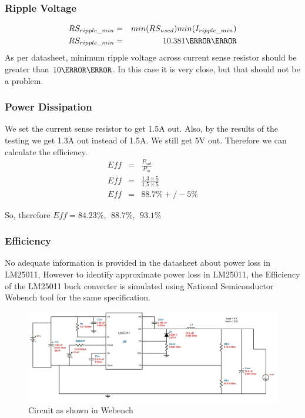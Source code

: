 \subsubsection{Ripple Voltage}
\begin{eqnarray}
RS_{ripple\_min}&=&min(RS_{used})min(I_{ripple\_min})\\
RS_{ripple\_min}&=&10.381 \milli\volt
\end{eqnarray}
As per datasheet, minimum ripple voltage across current sense resistor should be greater than $10\milli\volt$. In this case it is very close, but that should not be a problem.

\subsubsection{Power Dissipation}
We set the current sense resistor to get 1.5A out. Also, by the results of the testing we get 1.3A out instead of 1.5A. We still get 5V out. Therefore we can calculate the efficiency.
\begin{eqnarray}
Eff&=&\frac{P_{out}}{P_{in}}\\
Eff&=&\frac{1.3 \times 5}{1.5 \times 5}\\
Eff&=&88.7\% +/- 5\%
\end{eqnarray}

So, therefore $Eff=84.23\percent,\ \ 88.7\percent,\ \ 93.1\percent$

\subsubsection{Efficiency}
No adequate information is provided in the datasheet about power loss in LM25011, However to identify approximate power loss in LM25011, the Efficiency of the LM25011 buck converter is simulated using National Semiconductor Webench tool for the same specification.\cite{WEBENCH}

\begin{figure}[htbp]
\begin{center}
\includegraphics[width=5in]{includes/WebenchCircuit}
\caption{Circuit as shown in Webench}
\end{center}
\end{figure}


